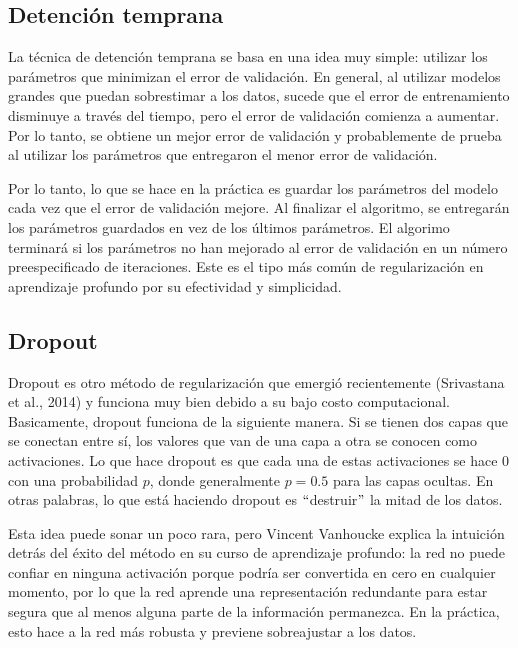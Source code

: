 \subsection{Detención temprana}
La técnica de detención temprana se basa en una idea muy simple: utilizar los parámetros que minimizan el error de validación. En general, al utilizar modelos grandes que puedan sobrestimar a los datos, sucede que el error de entrenamiento disminuye a través del tiempo, pero el error de validación comienza a aumentar. Por lo tanto, se obtiene un mejor error de validación y probablemente de prueba al utilizar los parámetros que entregaron el menor error de validación.
\cite{goodfellow-et-al-2016}

\vspace{1em}

Por lo tanto, lo que se hace en la práctica es guardar los parámetros del modelo cada vez que el error de validación mejore. Al finalizar el algoritmo, se entregarán los parámetros guardados en vez de los últimos parámetros. El algorimo terminará si los parámetros no han mejorado al error de validación en un número preespecificado de iteraciones. Este es el tipo más común de regularización en aprendizaje profundo por su efectividad y simplicidad.
\cite{goodfellow-et-al-2016}

\subsection{Dropout}
Dropout es otro método de regularización que emergió recientemente (Srivastana et al., 2014) y funciona muy bien debido a su bajo costo computacional. Basicamente, dropout funciona de la siguiente manera. Si se tienen dos capas que se conectan entre sí, los valores que van de una capa a otra se conocen como activaciones. Lo que hace dropout es que cada una de estas activaciones se hace 0 con una probabilidad $p$, donde generalmente $p=0.5$ para las capas ocultas. En otras palabras, lo que está haciendo dropout es $``$destruir$"$ la mitad de los datos.
\cite{goodfellow-et-al-2016}
\cite{Srivastava:2014:DSW:2627435.2670313}
\cite{deeplearningbygoogle}

\vspace{1em}

Esta idea puede sonar un poco rara, pero Vincent Vanhoucke explica la intuición detrás del éxito del método en su curso de aprendizaje profundo: la red no puede confiar en ninguna activación porque podría ser convertida en cero en cualquier momento, por lo que la red aprende una representación redundante para estar segura que al menos alguna parte de la información permanezca. En la práctica, esto hace a la red más robusta y previene sobreajustar a los datos. 
\cite{goodfellow-et-al-2016}
\cite{deeplearningbygoogle}


